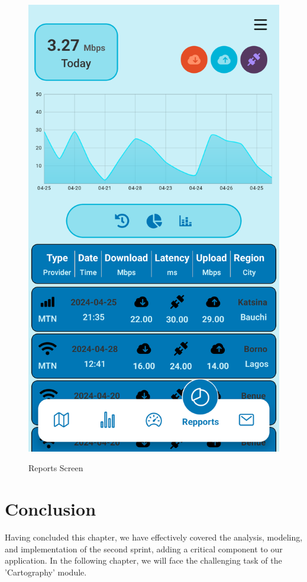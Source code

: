 \begin{figure}[H]
\begin{minipage}{0.35\textwidth}
    \includegraphics[width=\linewidth]{images/sprint2/ReportingModule (2).png}
    \label{fig:login-form}
\end{minipage}\hfill
    \caption{Reports Screen}
\end{figure}


\section*{Conclusion}

Having concluded this chapter, we have effectively covered the analysis, modeling, and implementation of the second sprint, adding a critical component to our application. In the following chapter, we will face the challenging task of the 'Cartography' module.
